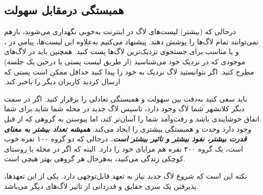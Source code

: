 \subsection{همبستگی درمقابل سهولت}

درحالی که (بیشتر) لیست‌های لاگ در اینترنت  ‫به‌خوبی نگهداری می‌شوند،
بازهم نمی‌توانند تمام لاگ‌ها را پوشش دهند. پیشنهاد می‌کنیم به‌علاوه این لیست‌ها، پیامی در
،
و یا
مناسب برای جستجوی نزدیک‌ترین لاگ‌ها پست کنید.
همچنین باید در لاگ‌های موجودی که در نزدیک خود می‌شناسید
(از طریق لیست پستی یا درحین یک جلسه) مطرح کنید.
اگر نتوانستید لاگ نزدیک به خود را پیدا کنید حداقل ممکن است
پستی که ارسال کردید کاربران دیگر را باخبر کند.


باید سعی کنید به‌دقت بین سهولت و همبستگی تعادلی را برقرار کنید.
اگر در سمت دیگر کلانشهر شما لاگ وجود دارد، تاسیس لاگ جدید
در محله شما شاید برای شما اتفاق خوشایندی باشد و رفت‌وآمد شما را آسان‌تر کند،
اما پیوستن به گروهی که از قبل وجود دارد وحدت و همبستگی بیشتری را ایجاد می‌کند.
{\bfseries {\itshape
همیشه تعداد بیشتر به معنای قدرت بیشتر، نفوذ بیشتر و تاثیر بیشتر است.
}}
درحالی که دو گروه ۱۰۰ نفره خوب است، یک گروه ۲۰۰ نفره هم مزایای خود را دارد.
البته که اگر در محله یا روستای کوچکی زندگی می‌کنید، به‌هرحال هر گروهی بهتر هیچی است.

نکته این است که شروع لاگ جدید نیاز به تعهد قابل‌توجهی دارد.
یکی از این تعهد‌ها، پذیرفتن یک سری حقایق و قدردانی از تاثیر لاگ‌های
دیگر می‌باشد.

